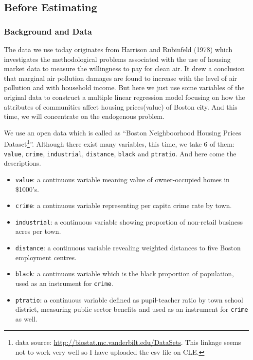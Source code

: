 \documentclass[
  12pt,
]{article}
\providecommand{\tightlist}{%
  \setlength{\itemsep}{0pt}\setlength{\parskip}{0pt}}
\begin{document}
\hypertarget{before-estimating}{%
\subsection{Before Estimating}\label{before-estimating}}

\hypertarget{background-and-data-7}{%
\subsubsection{Background and Data}\label{background-and-data-7}}

The data we use today originates from Harrison and Rubinfeld (1978) which investigates the methodological problems associated with the use of housing market data to measure the willingness to pay for clean air. It drew a conclusion that marginal air pollution damages are found to increase with the level of air pollution and with household income. But here we just use some variables of the original data to construct a multiple linear regression model focusing on how the attributes of communities affect housing prices(value) of Boston city. And this time, we will concentrate on the endogenous problem.

We use an open data which is called as ``Boston Neighboorhood Housing Prices Dataset\footnote{data source: \url{http://biostat.mc.vanderbilt.edu/DataSets}. This linkage seems not to work very well so I have uploaded the csv file on CLE.}''. Although there exist many variables, this time, we take 6 of them: \texttt{value}, \texttt{crime}, \texttt{industrial}, \texttt{distance}, \texttt{black} and \texttt{ptratio}. And here come the descriptions.

\begin{itemize}
\tightlist
\item
  \texttt{value}: a continuous variable meaning value of owner-occupied homes in \$1000's.
\item
  \texttt{crime}: a continuous variable representing per capita crime rate by town.
\item
  \texttt{industrial}: a continuous variable showing proportion of non-retail business acres per town.
\item
  \texttt{distance}: a continuous variable revealing weighted distances to five Boston employment centres.
\item
  \texttt{black}: a continuous variable which is the black proportion of population, used as an instrument for \texttt{crime}.
\item
  \texttt{ptratio}: a continuous variable defined as pupil-teacher ratio by town school district, measuring public sector benefits and used as an instrument for \texttt{crime} as well.
\end{itemize}
\end{document}
